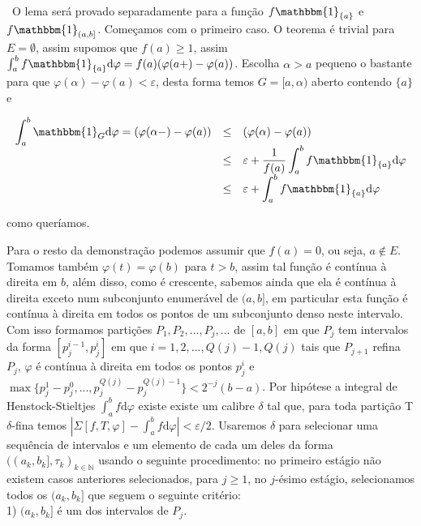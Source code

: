\documentclass[12pt, a4paper]{article}
\def\dem{\par\smallbreak\noindent {\textit{ Demonstração:}} \ }
\theoremstyle{definition}
\begin{document}
\dem O lema será provado separadamente para a função $f\mathbbm{1}_{\{a\}}$ e $f\mathbbm{1}_{(a,b]}$. Começamos com o primeiro caso. O teorema é trivial para $E=\emptyset$, assim supomos que $f(a)\geq 1$, assim $\int_a^b f\mathbbm{1}_{\{a\}}  \text{d}\varphi =f(a)(\varphi(a+)-\varphi(a))$. Escolha $\alpha > a$ pequeno o bastante para que $\varphi(\alpha)-\varphi(a)<\varepsilon $, desta forma temos $G=[a,\alpha)$ aberto contendo $\{a\}$ e 

$$\begin{array}{lll}
 
\displaystyle\int_a^b \mathbbm{1}_G  \text{d}\varphi =(\varphi(\alpha-)-\varphi(a)) & \leq & (\varphi(\alpha)-\varphi(a)) \\
\ & \leq & \varepsilon+\displaystyle\frac{1}{f(a)}\displaystyle\int_a^b f \mathbbm{1}_{\{a\}}  \text{d}\varphi \\
\ & \leq &  \varepsilon + \displaystyle\int_a^b f \mathbbm{1}_{\{a\}}  \text{d}\varphi
\end{array}$$

como queríamos. 

Para o resto da demonstração podemos assumir que $f(a)=0$, ou seja, $a\notin E$. Tomamos também $\varphi(t)=\varphi(b)$ para $t>b$, assim tal função é contínua à direita em $b$, além disso, como é crescente, sabemos ainda que ela é contínua à direita exceto num subconjunto enumerável de $(a,b]$, em particular esta função é contínua à direita em todos os pontos de um subconjunto denso neste intervalo. Com isso formamos partições $P_1, P_2,..., P_j,...$ de $[a,b]$ em que $P_j$ tem intervalos da forma $[p_j^{i-1},p_j^{i}]$ em que $i=1,2,...,Q(j)-1,Q(j)$ tais que $P_{j+1}$ refina $P_{j}$, $\varphi$ é contínua à direita em todos os pontos $p_j^i$ e $\max\{ p_j^1-p_j^0,...,p_j^{Q(j)}-p_j^{Q(j)-1} \}< 2^{-j}(b-a)$. Por hipótese a integral de Henstock-Stieltjes $\int_a^b f  \text{d}\varphi$ existe existe um calibre $\delta$ tal que, para toda partição T $\delta$-fina temos $|\Sigma[f,T,\varphi]-\int_a^b f  \text{d}\varphi|<\varepsilon / 2$. Usaremos $\delta$ para selecionar uma sequência de intervalos e um elemento de cada um deles da forma $((a_k,b_k],\tau_k)_{k\in \mathbb{N}}$ usando o seguinte procedimento: no primeiro estágio não existem casos anteriores selecionados, para $j\geq 1$, no $j$-ésimo estágio, selecionamos todos os $(a_k,b_k]$ que seguem o seguinte critério: \\

1) $(a_k,b_k]$ é um dos intervalos de $P_j$. \\
\end{document}
